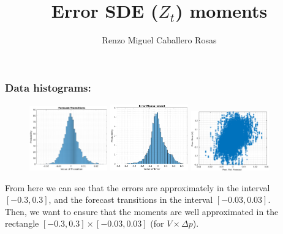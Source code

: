 \documentclass[aspectratio=169]{beamer}\usepackage[utf8]{inputenc}
\title{Error SDE ($Z_t$) moments}
\subtitle{Renzo Miguel Caballero Rosas}
\begin{document}
\begin{frame}
\titlepage
\end{frame}


\begin{frame}\frametitle{Data histograms:}

\begin{figure}[ht!]
\centering
\includegraphics[width=0.3\textwidth]{../../MATLAB_Files/Results/histograms/others/forecast_transitions.eps}\quad
\includegraphics[width=0.3\textwidth]{../../MATLAB_Files/Results/histograms/others/error_measurement.eps}\quad
\includegraphics[width=0.3\textwidth]{../../MATLAB_Files/Results/histograms/others/error_and_forecast.eps}
\end{figure}
From here we can see that the errors are approximately in the interval $[-0.3,0.3]$, and the forecast transitions in the interval $[-0.03,0.03]$.\\
Then, we want to ensure that the moments are well approximated in the rectangle $[-0.3,0.3]\times[-0.03,0.03]$ (for $V\times\Delta p$).

\end{frame}
\end{document}
